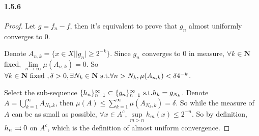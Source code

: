 \documentclass{article}
\begin{document}
\paragraph{1.5.6}
\begin{proof}
Let $g=f_n-f$, then it's equivalent to prove that $g_n$ almost uniformly converges to 0.

Denote $A_{n,k}=\{x\in X| |g_n|\geq 2^{-k}\}$. Since $g_n$ converges to 0 in measure, $\forall k\in\mathbf{N}$ fixed, $\lim\limits_{n\to\infty}\mu(A_{n,k})=0$. So $\forall k\in \mathbf{N}\text{ fixed },\delta>0,\exists N_k\in\mathbf{N}\text{ s.t.} \forall n>N_k, \mu(A_{n,k})<\delta4^{-k}$.

Select the sub-sequence $\{h_n\}_{n=1}^{\infty}\subset\{g_n\}_{n=1}^{\infty}\text{ s.t.} h_k=g_{N_k}$. Denote $A=\bigcup\limits_{k=1}^{\infty}A_{N_k.k}$, then $\mu(A)\leq\sum_{k=1}^{\infty}\mu(A_{N_k,k})=\delta$. So while the measure of $A$ can be as small as possible, $\forall x\in A^c, \sup\limits_{m>n}h_m(x)\leq 2^{-n}$. So by definition, $h_n\rightrightarrows 0$ on $A^c$, which is the definition of almost uniform convergence.
\end{proof}
\end{document}
